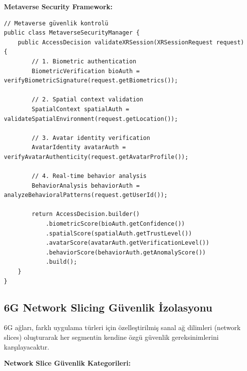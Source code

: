\textbf{Metaverse Security Framework:}
\begin{lstlisting}[breaklines=true,basicstyle=\ttfamily\footnotesize]
// Metaverse güvenlik kontrolü
public class MetaverseSecurityManager {
    public AccessDecision validateXRSession(XRSessionRequest request) {
        // 1. Biometric authentication
        BiometricVerification bioAuth = verifyBiometricSignature(request.getBiometrics());
        
        // 2. Spatial context validation
        SpatialContext spatialAuth = validateSpatialEnvironment(request.getLocation());
        
        // 3. Avatar identity verification
        AvatarIdentity avatarAuth = verifyAvatarAuthenticity(request.getAvatarProfile());
        
        // 4. Real-time behavior analysis
        BehaviorAnalysis behaviorAuth = analyzeBehavioralPatterns(request.getUserId());
        
        return AccessDecision.builder()
            .biometricScore(bioAuth.getConfidence())
            .spatialScore(spatialAuth.getTrustLevel())
            .avatarScore(avatarAuth.getVerificationLevel())
            .behaviorScore(behaviorAuth.getAnomalyScore())
            .build();
    }
}
\end{lstlisting}

\subsection{6G Network Slicing Güvenlik İzolasyonu}

6G ağları, farklı uygulama türleri için özelleştirilmiş sanal ağ dilimleri (network slices) oluşturarak her segmentin kendine özgü güvenlik gereksinimlerini karşılayacaktır.

\textbf{Network Slice Güvenlik Kategorileri:}



